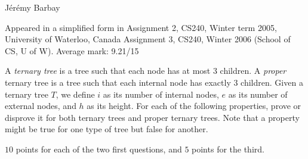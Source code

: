 \begin{authorship}J{\'e}r{\'e}my Barbay\end{authorship}
\begin{usage}
Appeared in a simplified form in 
Assignment 2, CS240, Winter term 2005, University of Waterloo, Canada
Assignment 3, CS240, Winter 2006 (School of CS, U of W). Average mark: 9.21/15
\end{usage}

A {\em ternary tree} is a tree such that each node has at most $3$ children.
A {\em proper} ternary tree is a tree such that each internal node has exactly $3$ children.
%
Given a ternary tree $T$, we define
  $i$ as its number of internal nodes,
  $e$ as its number of external nodes, and
  $h$ as its height.
%
For each of the following properties, prove or disprove it for both ternary
trees and proper ternary trees. Note that a property might be true for one type of tree but false for another.

\begin{INUTILE}
 \begin{markingScheme}
  $10$ points for each of the two first questions, and $5$ points for
  the third.
\end{markingScheme}
\end{INUTILE}

